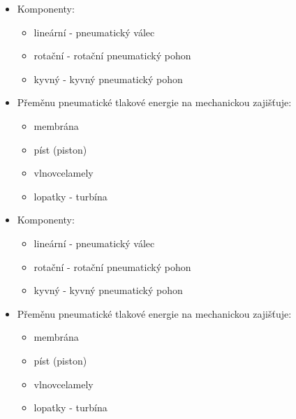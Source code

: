 \begin{itemize}
  \item Komponenty: \begin{itemize}
    \item lineární - pneumatický válec
    \item rotační - rotační pneumatický pohon
    \item kyvný - kyvný pneumatický pohon
  \end{itemize}
  \item Přeměnu pneumatické tlakové energie na mechanickou zajišťuje: \begin{itemize}
    \item membrána
    \item píst (piston)
    \item vlnovcelamely
    \item lopatky - turbína
  \end{itemize}
    \item Komponenty: \begin{itemize}
              \item lineární - pneumatický válec
              \item rotační - rotační pneumatický pohon
              \item kyvný - kyvný pneumatický pohon
          \end{itemize}
    \item Přeměnu pneumatické tlakové energie na mechanickou zajišťuje: \begin{itemize}
              \item membrána
              \item píst (piston)
              \item vlnovcelamely
              \item lopatky - turbína
          \end{itemize}
\end{itemize}


